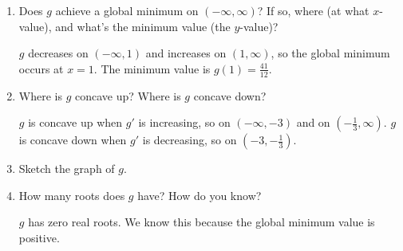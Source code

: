 \documentclass{article}
\begin{document}
\begin{enumerate}[resume, topsep=0pt]
\begin{enumerate}[start=2]
  \item
    \begin{problem}[\vfill]
      Does $g$ achieve a global minimum on $(-\infty, \infty)$? If so, where (at what $x$-value), and what's the minimum value (the $y$-value)? 
    \end{problem}

    \begin{solution}
      $g$ decreases on $(-\infty, 1)$ and increases on $(1, \infty)$,
      so the global minimum occurs at $x=1$. The minimum value is
      $g(1)=\frac{41}{12}$.
    \end{solution}

  \item
    \begin{problem}[\vfill]
      Where is $g$ concave up? Where is $g$ concave down?
    \end{problem}

    \begin{solution}
      $g$ is concave up when $g'$ is increasing, so on $(-\infty, -3)$ 
      and on $(-\frac{1}{3}, \infty)$. $g$ is concave down when $g'$
      is decreasing, so on $(-3, -\frac{1}{3})$.
    \end{solution}

  \item
    \begin{problem}[\stretch{2}]
      Sketch the graph of $g$. 
    \end{problem}

   \begin{solution}
    \begin{center}
    \end{center}
  \end{solution}

  \item
    \begin{problem}[\nstretch{0.25}]
      How many roots does $g$ have? How do you know?
    \end{problem}

    \begin{solution}
      $g$ has zero real roots. We know this because
      the global minimum value is positive.
    \end{solution}

  \end{enumerate}

\end{enumerate}
\end{document}
